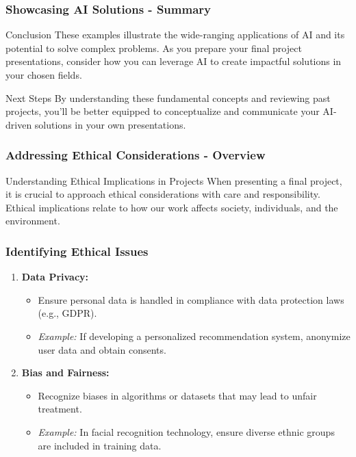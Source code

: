 \documentclass{beamer}
\begin{document}
\begin{frame}[fragile]
    \frametitle{Showcasing AI Solutions - Summary}
    \begin{block}{Conclusion}
        These examples illustrate the wide-ranging applications of AI and its potential to solve complex problems. As you prepare your final project presentations, consider how you can leverage AI to create impactful solutions in your chosen fields.
    \end{block}
    \begin{block}{Next Steps}
        By understanding these fundamental concepts and reviewing past projects, you'll be better equipped to conceptualize and communicate your AI-driven solutions in your own presentations.
    \end{block}
\end{frame}

\begin{frame}[fragile]
    \frametitle{Addressing Ethical Considerations - Overview}
    \begin{block}{Understanding Ethical Implications in Projects}
        When presenting a final project, it is crucial to approach ethical considerations with care and responsibility. Ethical implications relate to how our work affects society, individuals, and the environment. 
    \end{block}
\end{frame}

\begin{frame}[fragile]
    \frametitle{Identifying Ethical Issues}
    \begin{enumerate}
        \item \textbf{Data Privacy:} 
            \begin{itemize}
                \item Ensure personal data is handled in compliance with data protection laws (e.g., GDPR).
                \item \textit{Example:} If developing a personalized recommendation system, anonymize user data and obtain consents.
            \end{itemize}
        \item \textbf{Bias and Fairness:} 
            \begin{itemize}
                \item Recognize biases in algorithms or datasets that may lead to unfair treatment.
                \item \textit{Example:} In facial recognition technology, ensure diverse ethnic groups are included in training data.
            \end{itemize}
    \end{enumerate}
\end{frame}
\end{document}

